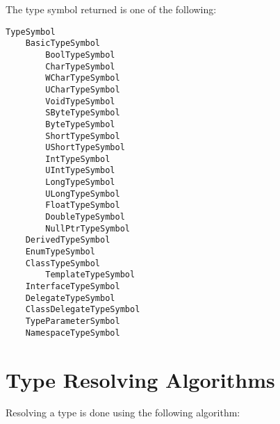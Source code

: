 \documentclass[a4paper,oneside,11pt]{book}
\theoremstyle{definition}
\begin{document}
The type symbol returned is one of the following:
\begin{verbatim}
TypeSymbol
    BasicTypeSymbol
        BoolTypeSymbol
        CharTypeSymbol
        WCharTypeSymbol
        UCharTypeSymbol
        VoidTypeSymbol
        SByteTypeSymbol
        ByteTypeSymbol
        ShortTypeSymbol
        UShortTypeSymbol
        IntTypeSymbol
        UIntTypeSymbol
        LongTypeSymbol
        ULongTypeSymbol
        FloatTypeSymbol
        DoubleTypeSymbol
        NullPtrTypeSymbol
    DerivedTypeSymbol
    EnumTypeSymbol
    ClassTypeSymbol
        TemplateTypeSymbol
    InterfaceTypeSymbol
    DelegateTypeSymbol
    ClassDelegateTypeSymbol
    TypeParameterSymbol
    NamespaceTypeSymbol
\end{verbatim}

\clearpage
\section{Type Resolving Algorithms}
Resolving a type is done using the following algorithm:
\end{document}
